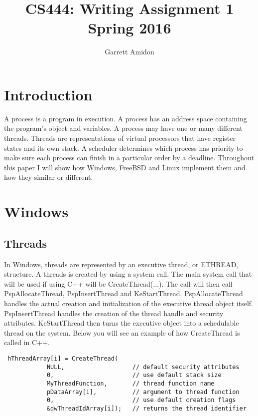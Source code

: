 \documentclass[letterpaper,10pt,titlepage,draftclsnofoot,onecolumn]{IEEEtran}
\title{CS444: Writing Assignment 1 \\
	\large Spring 2016}
\author{Garrett Amidon}
\begin{document}
\begin{titlingpage}
    \maketitle
	\centering{}
\end{titlingpage}
\section{Introduction}

A process is a program in execution. A process has an address space containing the program's object and variables. A process may have one or many different threads. Threads are representations of virtual processors that have register states and its own stack. A scheduler determines which process has priority to make sure each process can finish in a particular order by a deadline. \cite{FreeBSD} Throughout this paper I will show how Windows, FreeBSD and Linux implement them and how they similar or different. 

\section{Windows}

\subsection{Threads}


In Windows, threads are represented by an executive thread, or ETHREAD, structure.  A threads is created by using a system call. The main system call that will be used if using C++ will be CreateThread(...). The call will then call PspAllocateThread, PspInsertThread and KeStartThread. PspAllocateThread handles the actual creation and initialization of the executive thread object itself. PspInsertThread handles the creation of the thread handle and security attributes. KeStartThread then turns the executive object into a schedulable  thread on the system. \cite{Windows} Below you will see an example of how CreateThread is called in C++.


\begin{lstlisting}
 hThreadArray[i] = CreateThread( 
            NULL,                   // default security attributes
            0,                      // use default stack size  
            MyThreadFunction,       // thread function name
            pDataArray[i],          // argument to thread function 
            0,                      // use default creation flags 
            &dwThreadIdArray[i]);   // returns the thread identifier 
\end{lstlisting}
\end{document}
